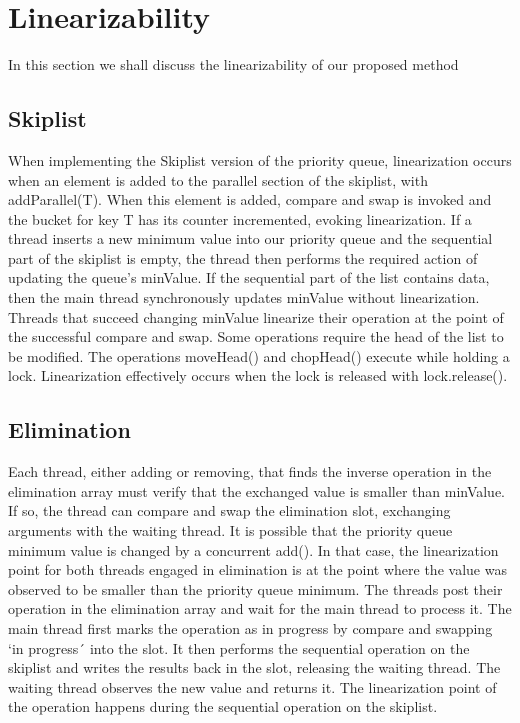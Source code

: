 \documentclass[10pt]{asme2ej}
\begin{document}
\section{Linearizability}

In this section we shall discuss the linearizability of our proposed method

\subsection{Skiplist}

When implementing the Skiplist version of the priority queue, linearization occurs when an element is added to the parallel section of the skiplist, with addParallel(T). When this element is added, compare and swap is invoked and the bucket for key T has its counter incremented, evoking linearization. If a thread inserts a new minimum value into our priority queue and the sequential part of the skiplist is empty, the thread then performs the required action of updating the queue’s minValue. If the sequential part of the list contains data, then the main thread synchronously updates minValue without linearization. Threads that succeed changing minValue linearize their operation at the point of the successful compare and swap. Some operations require the head of the list to be modified. The operations moveHead() and chopHead() execute while holding a lock. Linearization effectively occurs when the lock is released with lock.release().

\subsection{Elimination}

Each thread, either adding or removing, that finds the inverse operation in the elimination array must verify that the exchanged value is smaller than minValue. If so, the thread can compare and swap the elimination slot, exchanging arguments with the waiting thread. It is possible that the priority queue minimum value is changed by a concurrent add(). In that case, the linearization point for both threads engaged in elimination is at the point where the value was observed to be smaller than the priority queue minimum. The threads post their operation in the elimination array and wait for the main thread to process it. The main thread first marks the operation as in progress by compare and swapping ‘in progress´ into the slot. It then performs the sequential operation on the skiplist and writes the results back in the slot, releasing the waiting thread. The waiting thread observes the new value and returns it. The linearization point of the operation happens during the sequential operation on the skiplist.
\end{document}
